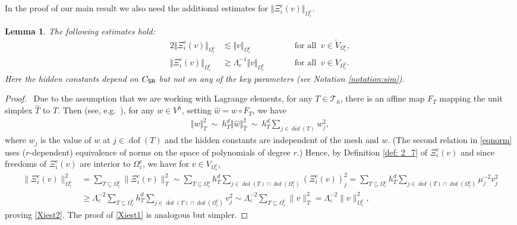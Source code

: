 \documentclass[numbers,webpdf,imaiai]{ima-authoring-template}%
\theoremstyle{thmstyletwo}%
\newtheorem{lemma}[theorem]{Lemma}
\numberwithin{equation}{section}
\newcommand{\scT}{\mathcal{T}}
\newcommand{\wV}{\widetilde{V}}
\newcommand{\shapereg}{C_{\textup{\textsf{SR}}}}
\numberwithin{equation}{section}
\DeclareMathOperator{\dof}{dof}
\newcommand{\ovdof}{\overline{\dof}}
\begin{document}
{In the proof of our main result we also need the additional estimates for $\Vert \Xi_i^{{c}}(v)\Vert_{\Omega_i^c}$.

\begin{lemma} \label{Xi_below}
The following estimates hold:
\begin{alignat}{2}
	\Vert \Xi_i^{{c}} (v)\Vert_{\Omega_i^c} &\lesssim  \Vert v \Vert_{\Omega_i^c} \qquad 
	&& \text{for all} \;\; v \in \wV_{{\Omega_i^c}},
	\label{Xiest1}
	\\[1ex]
	\Vert \Xi_i^{{c}} (v)\Vert_{\Omega_i^c} &\gtrsim \Lambda_c^{-1} \Vert v \Vert_{\Omega_i^c} \qquad 
	&& \text{for all} \;\;  v \in V_{{\Omega_i^c}}. 
	\label{Xiest2} 
\end{alignat}
Here the hidden constants depend on $\shapereg$ but not on any of the key parameters (see Notation \ref{notation:sim}).
\end{lemma}

\begin{proof}\,
Due to the assumption that we are working with Lagrange elements,   
for any $T \in \scT_h$, there is an affine map $F_T$ mapping the unit simplex $\widehat{T}$ to $T$.
Then (see, e.g.\ \cite[Theorem~3.1.2]{Ciarlet:2002:FEM}), for any $w \in V^h$, setting $\widehat{w} = w \circ F_T$, we have   
\begin{align} \label{eqnorm}
	\Vert w \Vert_T^2 \ \sim\  h_T^{d} \Vert \widehat{w}\Vert_{\widehat{T}}^2 \ \sim \ h_T^{d} \sum_{j \in \ovdof(T)} w_j^2,
\end{align}
where $w_j$ is the value of $w$ at $j \in \dof(T)$ and the hidden  constants are independent of the mesh and $w$.   
(The second relation in \eqref{eqnorm} uses {($r$-dependent)} equivalence of norms on the space of polynomials of degree $r$.)
Hence, by Definition \ref{def: 2_7} of $\Xi_i^{{c}}(v)$ and since freedoms of $\Xi_i^c(v)$ are interior to $\Omega_i^c$, 
we have {for $v \in V_{\Omega_i^c}$,} 
\begin{align*}
	\|\Xi_i^{{c}}(v)\|_{\Omega_i^c}^2 
	&= \sum_{T \subseteq \overline{\Omega_i^c}}\|\Xi_i^{c}(v)\|_{T}^2 
	\sim \sum_{T \subseteq \overline{\Omega_i^c}} h_T^d \sum_{j \in \ovdof(T) \cap \dof(\Omega_i^c)}
	(\Xi_i^{{c}}(v))_j^2  
	= \sum_{T \subseteq \overline{\Omega_i^c}} h_T^d \sum_{j \in \ovdof(T) \cap \dof(\Omega_i^c)}
	\mu_j^{-2} v_j^2 
	\nonumber\\[0.5ex]
	&\ge \Lambda_c^{-2} \sum_{T \subseteq \overline{\Omega_i^c}} h_T^d \sum_ {j \in \ovdof(T) \cap \dof(\Omega_i^c)}  v_j^2 
	\sim  \Lambda_c^{-2}\sum_{T \subseteq \overline{\Omega_i^c}}\|v\|_{T}^2 = \Lambda_c^{-2} \|v\|_{\Omega_i^c}^2, 
\end{align*}
proving \eqref{Xiest2}.  The proof of \eqref{Xiest1} is analogous but simpler.  
\end{proof}


}
\end{document}
